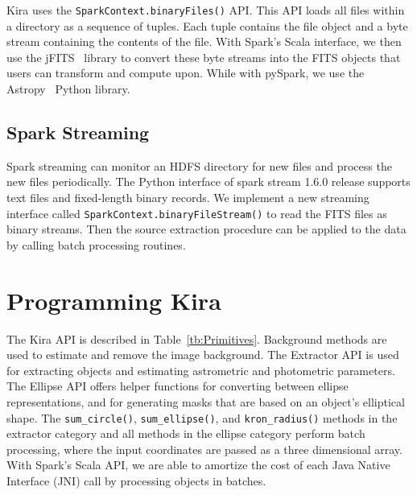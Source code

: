 \documentclass[10pt,journal,compsoc]{IEEEtran}
\begin{document}
Kira uses the \texttt{SparkContext.binaryFiles()} API.
This API loads all files within a directory as a sequence of tuples. 
Each tuple contains the file object and a byte stream containing the contents of the file. 
With Spark's Scala interface, we then use the jFITS~\cite{jfits} library to convert these byte streams 
into the FITS objects that users can transform and compute upon. 
While with pySpark, we use the Astropy~\cite{astropy13} Python library.

\subsection{Spark Streaming}
\label{sec:Design-Streaming}
Spark streaming can monitor an HDFS directory for new files and process the new files periodically. 
The Python interface of spark stream 1.6.0 release supports text files and fixed-length binary records.
We implement a new streaming interface called \texttt{SparkContext.binaryFileStream()} to read the FITS
files as binary streams. 
Then the source extraction procedure can be applied to the data by calling batch processing routines.

\section{Programming Kira}
\label{sec:Programming}
The Kira API is described in Table~\ref{tb:Primitives}. 
Background methods are used to estimate and remove the image background. The Extractor
API is used for extracting objects and estimating astrometric and photometric parameters. The Ellipse API offers helper
functions for converting between ellipse representations, and for generating masks that are based on an object's elliptical
shape. The \texttt{sum\_circle()}, \texttt{sum\_ellipse()}, and \texttt{kron\_radius()} methods in the extractor category and all
methods in the ellipse category perform batch processing, where the input coordinates are passed as a three dimensional array. 
With Spark's Scala API, we are able to amortize the cost of each Java Native Interface (JNI) call by processing objects in batches.
\end{document}
